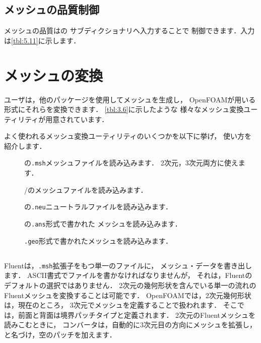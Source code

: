 \subsection{メッシュの品質制御}
\label{ssec:5.4.8}
メッシュの品質はの
サブディクショナリへ入力することで
制御できます．入力は\autoref{tbl:5.11}に示します．



\section{メッシュの変換}
\label{sec:5.5}
ユーザは，他のパッケージを使用してメッシュを生成し，
OpenFOAMが用いる形式にそれらを変換できます．
\autoref{tbl:3.6}に示したような
様々なメッシュ変換ユーティリティが用意されています．

よく使われるメッシュ変換ユーティリティのいくつかを以下に挙げ，
使い方を紹介します．
\begin{description}
 \item[]
%
%
            の\texttt{.msh}メッシュファイルを読み込みます．
            2次元，3次元両方に使えます．
 \item[]
%
%
            /のメッシュファイルを読み込みます．
 \item[]
%
%
            の\texttt{.neu}ニュートラルファイルを読み込みます．
 \item[]
%
%
            の\texttt{.ans}形式で書かれた
            メッシュを読み込みます．
 \item[]
%
%
            \texttt{.geo}形式で書かれたメッシュを読み込みます．
\end{description}


\subsection{}
\label{ssec:5.5.1}
Fluentは，\texttt{.msh}拡張子をもつ単一のファイルに，
メッシュ・データを書き出します．
ASCII書式でファイルを書かなければなりませんが，
それは，Fluentのデフォルトの選択ではありません．
2次元の幾何形状を含んでいる単一の流れの
Fluentメッシュを変換することは可能です．
OpenFOAMでは，2次元幾何形状は，現在のところ，
3次元でメッシュを定義することで扱われます．
そこでは，前面と背面は境界パッチタイプと定義されます．
2次元のFluentメッシュを読みこむときに，
コンバータは，自動的に3次元目の方向にメッシュを拡張し，
と名づけ，空のパッチを加えます．

